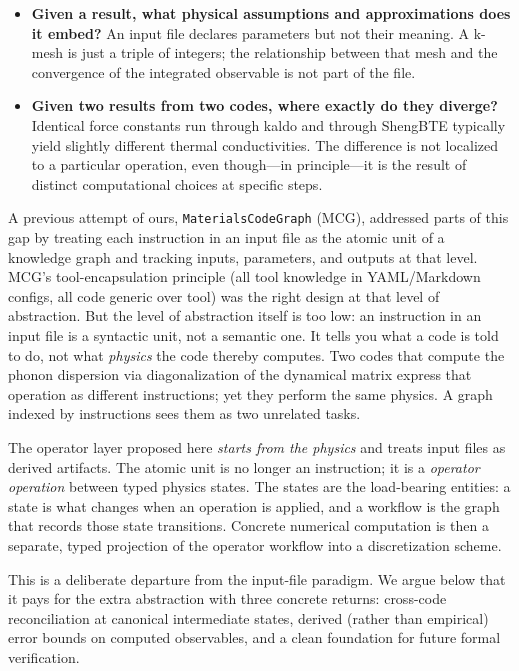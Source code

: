 \documentclass[11pt,a4paper]{article}
\begin{document}
\begin{itemize}[leftmargin=2em]
  \item \textbf{Given a result, what physical assumptions and approximations does it embed?}
        An input file declares parameters but not their meaning. A k-mesh is just a triple of
        integers; the relationship between that mesh and the convergence of the integrated
        observable is not part of the file.
  \item \textbf{Given two results from two codes, where exactly do they diverge?} Identical force
        constants run through kaldo and through ShengBTE typically yield slightly different
        thermal conductivities. The difference is not localized to a particular operation, even
        though---in principle---it is the result of distinct computational choices at specific
        steps.
\end{itemize}

A previous attempt of ours, \texttt{MaterialsCodeGraph} (MCG), addressed parts of this gap by
treating each instruction in an input file as the atomic unit of a knowledge graph and tracking
inputs, parameters, and outputs at that level. MCG's tool-encapsulation principle (all tool
knowledge in YAML/Markdown configs, all code generic over tool) was the right design at that
level of abstraction. But the level of abstraction itself is too low: an instruction in an input
file is a syntactic unit, not a semantic one. It tells you what a code is told to do, not what
\emph{physics} the code thereby computes. Two codes that compute the phonon dispersion via
diagonalization of the dynamical matrix express that operation as different instructions; yet
they perform the same physics. A graph indexed by instructions sees them as two unrelated tasks.

\medskip

The operator layer proposed here \emph{starts from the physics} and treats input files as derived
artifacts. The atomic unit is no longer an instruction; it is a \emph{operator operation} between
typed physics states. The states are the load-bearing entities: a state is what changes when an
operation is applied, and a workflow is the graph that records those state transitions. Concrete
numerical computation is then a separate, typed projection of the operator workflow into a
discretization scheme.

This is a deliberate departure from the input-file paradigm. We argue below that it pays for the
extra abstraction with three concrete returns: cross-code reconciliation at canonical intermediate
states, derived (rather than empirical) error bounds on computed observables, and a clean
foundation for future formal verification.
\end{document}
